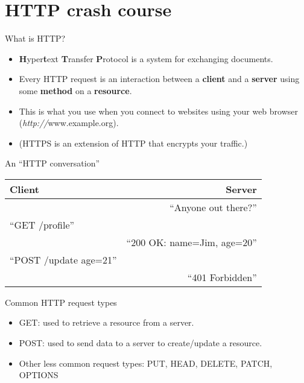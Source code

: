 \section{HTTP crash course}

\begin{frame}{What is HTTP?}
\begin{itemize}
    \item \textbf{H}yper\textbf{t}ext \textbf{T}ransfer \textbf{P}rotocol is a system for exchanging documents.
    \item Every HTTP request is an interaction between a \textbf{client} and a \textbf{server} using some \textbf{method} on a \textbf{resource}.
    \item This is what you use when you connect to websites using your web browser (\textit{http://}www.example.org).
    \item (HTTPS is an extension of HTTP that encrypts your traffic.)
\end{itemize}
\end{frame}

\begin{frame}{An ``HTTP conversation''}
\begin{tabular}{l r}
\textbf{Client}         & \textbf{Server}                     \\ \hline
                        & ``Anyone out there?''        \pause \\
``GET /profile''        &                              \pause \\
                        & ``200 OK: name=Jim, age=20'' \pause \\
``POST /update age=21'' &                              \pause \\
                        & ``401 Forbidden''
\end{tabular}
\end{frame}

\begin{frame}{Common HTTP request types}
\begin{itemize}
    \item GET: used to retrieve a resource from a server.
    \item POST: used to send data to a server to create/update a resource.
    \item Other less common request types: PUT, HEAD, DELETE, PATCH, OPTIONS
\end{itemize}
\end{frame}

